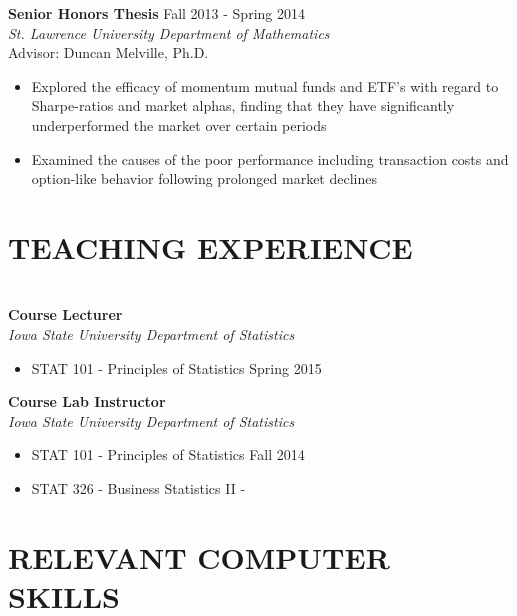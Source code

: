 \documentclass[10pt]{res} %
\begin{document}
\begin{resume}
{\bf Senior Honors Thesis }\hfill Fall 2013 - Spring 2014 \\
{\sl St. Lawrence University Department of Mathematics } \\
Advisor: Duncan Melville, Ph.D.
\begin{itemize} \itemsep -2pt
\item Explored the efficacy of momentum mutual funds and ETF's with regard to Sharpe-ratios and market alphas, finding that they have significantly underperformed the market over certain periods
\item Examined the causes of the poor performance including transaction costs and option-like behavior following prolonged market declines
\end{itemize}


\section{TEACHING EXPERIENCE}

\hrulefill \\
{\bf Course Lecturer} \\
{\sl Iowa State University Department of Statistics}
\begin{itemize} \itemsep -2pt
\item STAT 101 - Principles of Statistics \hfill Spring 2015
\end{itemize}

{\bf Course Lab Instructor} \\
{\sl Iowa State University Department of Statistics}
\begin{itemize} \itemsep -2pt 
\item STAT 101 - Principles of Statistics \hfill Fall 2014
\item STAT 326 - Business Statistics II \hfill -
\end{itemize}


\section{RELEVANT COMPUTER SKILLS}


\end{resume}
\end{document}
